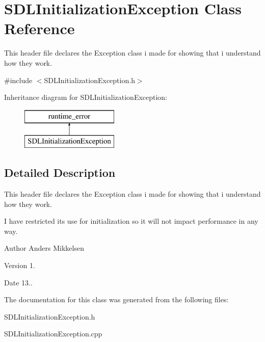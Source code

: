 \hypertarget{class_s_d_l_initialization_exception}{}\section{S\+D\+L\+Initialization\+Exception Class Reference}
\label{class_s_d_l_initialization_exception}


This header file declares the Exception class i made for showing that i understand how they work.  




{\ttfamily \#include $<$S\+D\+L\+Initialization\+Exception.\+h$>$}

Inheritance diagram for S\+D\+L\+Initialization\+Exception\+:\begin{figure}[H]
\begin{center}
\leavevmode
\includegraphics[height=2.000000cm]{class_s_d_l_initialization_exception}
\end{center}
\end{figure}


\subsection{Detailed Description}
This header file declares the Exception class i made for showing that i understand how they work. 

I have restricted its use for initialization so it will not impact performance in any way.

\begin{DoxyAuthor}{Author}
Anders Mikkelsen 
\end{DoxyAuthor}
\begin{DoxyVersion}{Version}
1. 
\end{DoxyVersion}
\begin{DoxyDate}{Date}
13.. 
\end{DoxyDate}


The documentation for this class was generated from the following files\+:\begin{DoxyCompactItemize}
\item 
S\+D\+L\+Initialization\+Exception.\+h\item 
S\+D\+L\+Initialization\+Exception.\+cpp\end{DoxyCompactItemize}
